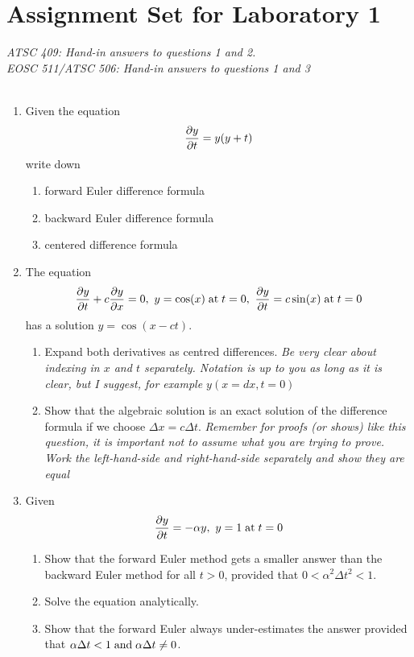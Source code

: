 \documentclass[12pt]{article}
\begin{document}
\section*{Assignment Set for Laboratory 1}
{\it ATSC 409: Hand-in answers to questions 1 and 2.\\
EOSC 511/ATSC 506: Hand-in answers to questions 1 and 3}\\[12pt]

\\[12pt]

\begin{enumerate}
\item Given the equation
\begin{equation}
\frac {\partial y}{\partial t} = y(y+t)
\end{equation}
write down
\begin{enumerate}
\item forward Euler difference formula
\item backward Euler difference formula
\item centered difference formula
\end{enumerate}

\item The equation
\begin{equation}
\frac {\partial y}{\partial t} + c \frac {\partial y}{\partial x} = 0,\ y = \cos(x) \;{\rm at}\; t=0,\ \frac {\partial y}{\partial t} = c \sin(x) \;{\rm at}\; t=0
\end{equation}
has a solution $y=\cos(x-ct)$.
\begin{enumerate}
\item Expand both derivatives as centred differences. {\it Be very
    clear about indexing in $x$ and $t$ separately.  Notation is up to
    you as long as it is clear, but I suggest, for example $y (x=dx, t=0)$}
\item Show that the algebraic solution is an exact solution of the
  difference formula if we choose $\Delta x = c \Delta t$.  {\it
    Remember for proofs (or shows) like this question, it is important
    not to assume what you are trying to prove.  Work the
    left-hand-side and right-hand-side separately and show they are equal}
\end{enumerate}
\item Given
\begin{equation}
\frac {\partial y}{\partial t} = -\alpha y,\ y = 1 \;{\rm at}\; t=0
\end{equation}
\begin{enumerate}
\item Show that the forward Euler method gets a smaller answer than
  the backward Euler method for all $t > 0$, provided that $0 <
  \alpha^2 \Delta t^2 < 1$.
\item Solve the equation analytically.
\item Show that the forward Euler always under-estimates the answer provided that $\alpha \Delta t < 1 \;{\rm and}\; \alpha \Delta t \ne 0$.
\end{enumerate}\end{enumerate}
\end{document}
